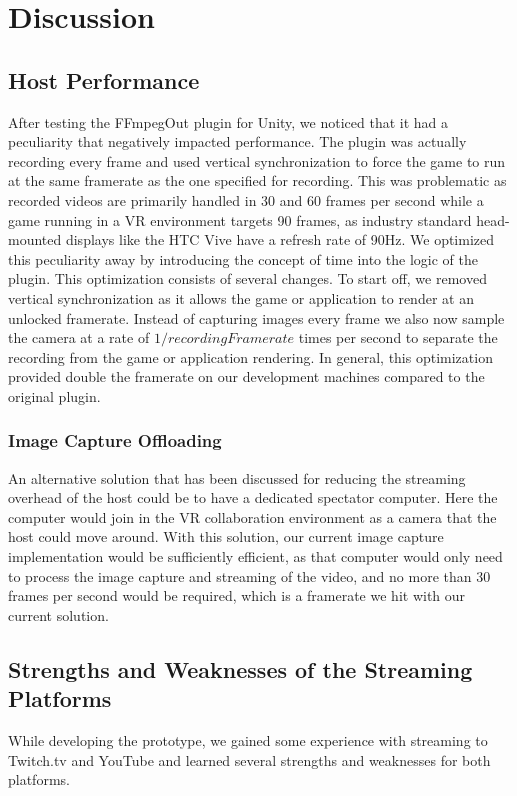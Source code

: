 \section{Discussion}
\subsection{Host Performance}
After testing the FFmpegOut plugin for Unity, we noticed that it had a peculiarity that negatively impacted performance. The plugin was actually recording every frame and used vertical synchronization to force the game to run at the same framerate as the one specified for recording. This was problematic as recorded videos are primarily handled in 30 and 60 frames per second while a game running in a VR environment targets 90 frames, as industry standard head-mounted displays like the HTC Vive have a refresh rate of 90Hz\cite{vive_specs}. We optimized this peculiarity away by introducing the concept of time into the logic of the plugin. This optimization consists of several changes. To start off, we removed vertical synchronization as it allows the game or application to render at an unlocked framerate. Instead of capturing images every frame we also now sample the camera at a rate of $1/recordingFramerate$ times per second to separate the recording from the game or application rendering. In general, this optimization provided double the framerate on our development machines compared to the original plugin. 

\subsubsection{Image Capture Offloading}
An alternative solution that has been discussed for reducing the streaming overhead of the host could be to have a dedicated spectator computer. Here the computer would join in the VR collaboration environment as a camera that the host could move around. With this solution, our current image capture implementation would be sufficiently efficient, as that computer would only need to process the image capture and streaming of the video, and no more than 30 frames per second would be required, which is a framerate we hit with our current solution.
    
\subsection{Strengths and Weaknesses of the Streaming Platforms}
While developing the prototype, we gained some experience with streaming to Twitch.tv and YouTube and learned several strengths and weaknesses for both platforms.

